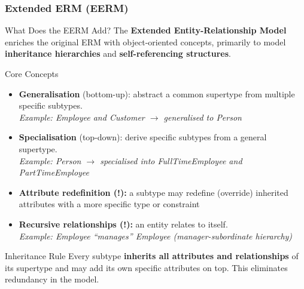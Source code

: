 \begin{frame}
  \frametitle{Extended ERM (EERM)}

  \begin{block}{What Does the EERM Add?}
    The \textbf{Extended Entity-Relationship Model} enriches the original ERM with object-oriented concepts, primarily to model \textbf{inheritance hierarchies} and \textbf{self-referencing structures}.
  \end{block}

  \begin{block}{Core Concepts}
    \begin{itemize}
      \item \textbf{Generalisation} (bottom-up): abstract a common supertype from multiple specific subtypes.\\
            \textit{Example: Employee and Customer $\to$ generalised to Person}
      \item \textbf{Specialisation} (top-down): derive specific subtypes from a general supertype.\\
            \textit{Example: Person $\to$ specialised into FullTimeEmployee and PartTimeEmployee}
      \item \textbf{Attribute redefinition (!):} a subtype may redefine (override) inherited attributes with a more specific type or constraint
      \item \textbf{Recursive relationships (!):} an entity relates to itself.\\
            \textit{Example: Employee ``manages'' Employee (manager-subordinate hierarchy)}
    \end{itemize}
  \end{block}

  \begin{alertblock}{Inheritance Rule}
    Every subtype \textbf{inherits all attributes and relationships} of its supertype and may add its own specific attributes on top. This eliminates redundancy in the model.
  \end{alertblock}
\end{frame}

